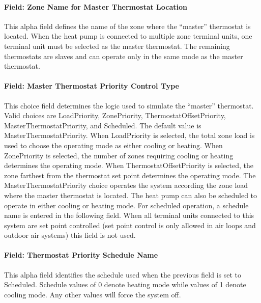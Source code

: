 \paragraph{Field: Zone Name for Master Thermostat Location}\label{field-zone-name-for-master-thermostat-location-000}

This alpha field defines the name of the zone where the ``master'' thermostat is located. When the heat pump is connected to multiple zone terminal units, one terminal unit must be selected as the master thermostat. The remaining thermostats are slaves and can operate only in the same mode as the master thermostat.

\paragraph{Field: Master Thermostat Priority Control Type}\label{field-master-thermostat-priority-control-type-000}

This choice field determines the logic used to simulate the ``master'' thermostat. Valid choices are LoadPriority, ZonePriority, ThermostatOffsetPriority, MasterThermostatPriority, and Scheduled. The default value is MasterThermostatPriority. When LoadPriority is selected, the total zone load is used to choose the operating mode as either cooling or heating. When ZonePriority is selected, the number of zones requiring cooling or heating determines the operating mode. When ThermostatOffsetPriority is selected, the zone farthest from the thermostat set point determines the operating mode. The MasterThermostatPriority choice operates the system according the zone load where the master thermostat is located. The heat pump can also be scheduled to operate in either cooling or heating mode. For scheduled operation, a schedule name is entered in the following field. When all terminal units connected to this system are set point controlled (set point control is only allowed in air loops and outdoor air systems) this field is not used.

\paragraph{Field: Thermostat Priority Schedule Name}\label{field-thermostat-priority-schedule-name-000}

This alpha field identifies the schedule used when the previous field is set to Scheduled. Schedule values of 0 denote heating mode while values of 1 denote cooling mode. Any other values will force the system off.

